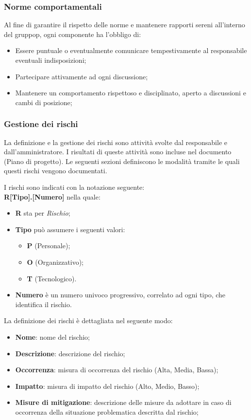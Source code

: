 \documentclass[10pt, a4paper]{article}
\begin{document}
\subsubsection{Norme comportamentali}
Al fine di garantire il rispetto delle norme e mantenere rapporti sereni all'interno del gruppop, ogni componente ha l'obbligo di:
\begin{itemize}
    \item Essere puntuale o eventualmente comunicare tempestivamente al responsabile eventuali indisposizioni;
    \item Partecipare attivamente ad ogni discussione;
    \item Mantenere un comportamento rispettoso e disciplinato, aperto a discussioni e cambi di posizione;
\end{itemize}

\subsubsection{Gestione dei rischi}
La definizione e la gestione dei rischi sono attività svolte dal responsabile e dall'amministratore.
I risultati di queste attività sono incluse nel documento (Piano di progetto).
Le seguenti sezioni definiscono le modalità tramite le quali questi rischi vengono documentati.

I rischi sono indicati con la notazione seguente:\\
\textbf{R[Tipo].[Numero]}
nella quale:
\begin{itemize}
\item \textbf{R} sta per \textit{Rischio};
\item \textbf{Tipo} può assumere i seguenti valori:
    \begin{itemize}
	\item \textbf{P} (Personale);
	\item \textbf{O} (Organizzativo);
	\item \textbf{T} (Tecnologico).
    \end{itemize}
\item \textbf{Numero} è un numero univoco progressivo, correlato ad ogni tipo, che identifica il rischio.
\end{itemize}

La definizione dei rischi è dettagliata nel seguente modo:
\begin{itemize}
    \item \textbf{Nome}: nome del rischio;
    \item \textbf{Descrizione}: descrizione del rischio;
    \item \textbf{Occorrenza}: misura di occorrenza del rischio (Alta, Media, Bassa);
    \item \textbf{Impatto}: misura di impatto del rischio (Alto, Medio, Basso);
    \item \textbf{Misure di mitigazione}: descrizione delle misure da adottare in caso di occorrenza della situazione problematica descritta dal rischio;
\end{itemize}
\end{document}
